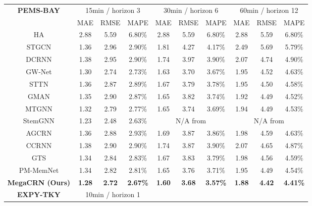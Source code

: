 \documentclass[letterpaper]{article} \usepackage{aaai23}  \usepackage{times}  \usepackage{helvet}  \usepackage{courier}  \usepackage[hyphens]{url}  \usepackage{graphicx} \urlstyle{rm} \def\UrlFont{\rm}  \usepackage{natbib}  \usepackage{caption} \usepackage{multirow}
\begin{document}
\begin{table*}[h]
{\begin{tabular*}{17.6cm}{@{\extracolsep{\fill}}cccccccccc}
\hline
		\multirow{2}{*}{\textbf{PEMS-BAY}} & \multicolumn{3}{c}{15min / horizon 3} &
		\multicolumn{3}{c}{30min / horizon 6} &
		\multicolumn{3}{c}{60min / horizon 12} \\
		\cline{2-4} \cline{5-7} \cline{8-10}
		\multicolumn{1}{l}{} & 
		\multicolumn{1}{c}{MAE} & 
		\multicolumn{1}{c}{RMSE} &
		\multicolumn{1}{c}{MAPE} &
		\multicolumn{1}{c}{MAE} & 
		\multicolumn{1}{c}{RMSE} &
		\multicolumn{1}{c}{MAPE} &
		\multicolumn{1}{c}{MAE} & 
		\multicolumn{1}{c}{RMSE} &
		\multicolumn{1}{c}{MAPE} \\
		\hline
		HA\cite{li2018diffusion} & 2.88 & 5.59 & 6.80\% & 2.88 & 5.59 & 6.80\% & 2.88 & 5.59 & 6.80\% \\
		STGCN\cite{yu2018spatio} & 1.36 & 2.96 & 2.90\% & 1.81 & 4.27 & 4.17\% & 2.49 & 5.69 & 5.79\% \\
		DCRNN\cite{li2018diffusion} & 1.38 & 2.95 & 2.90\% & 1.74 & 3.97 & 3.90\% & 2.07 & 4.74 & 4.90\% \\
		GW-Net\cite{wu2019graph} & 1.30 & 2.74 & 2.73\% & 1.63 & 3.70 & 3.67\% & 1.95 & 4.52 & 4.63\% \\
		STTN\cite{xu2020spatial} & 1.36 & 2.87 & 2.89\% & 1.67 & 3.79 & 3.78\% & 1.95 & 4.50 & 4.58\% \\
GMAN\cite{zheng2020gman} & 1.35 & 2.90 & 2.87\% & 1.65 & 3.82 & 3.74\% & 1.92 & 4.49 & 4.52\% \\ MTGNN\cite{wu2020connecting} & 1.32 & 2.79 & 2.77\% & 1.65 & 3.74 & 3.69\% & 1.94 & 4.49 & 4.53\% \\
		StemGNN\cite{cao2020spectral} & 1.23 & 2.48 & 2.63\% & \multicolumn{3}{c}{N/A from \cite{cao2020spectral}} & \multicolumn{3}{c}{N/A from \cite{cao2020spectral}} \\
		AGCRN\cite{bai2020adaptive} & 1.36 & 2.88 & 2.93\% & 1.69 & 3.87 & 3.86\% & 1.98 & 4.59 & 4.63\% \\
        CCRNN\cite{ye2021coupled} & 1.38 & 2.90 & 2.90\% & 1.74 & 3.87 & 3.90\% & 2.07 & 4.65 & 4.87\% \\
GTS\cite{shang2021discrete} & 1.34 & 2.84 & 2.83\% & 1.67 & 3.83 & 3.79\% & 1.98 & 4.56 & 4.59\% \\
PM-MemNet\cite{lee2021learning} & 1.34 & 2.82 & 2.81\% & 1.65 & 3.76 & 3.71\% & 1.95 & 4.49 & 4.54\% \\
\textbf{MegaCRN (Ours)} & \textbf{1.28} & \textbf{2.72} & \textbf{2.67\%} & \textbf{1.60} & \textbf{3.68} & \textbf{3.57\%} & \textbf{1.88} & \textbf{4.42} & \textbf{4.41\%} \\
		\hline
		\multirow{2}{*}{\textbf{EXPY-TKY}} & \multicolumn{3}{c}{10min / horizon 1} &

\end{tabular*}}
\end{table*}
\end{document}
